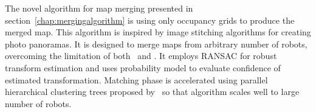 The novel algorithm for map merging presented in section~\ref{chap:mergingalgorithm} is using only occupancy grids to produce the merged map. This algorithm is inspired by image stitching algorithms for creating photo panoramas. It is designed to merge maps from arbitrary number of robots, overcoming the limitation of both~\cite{MapstitchROS} and \cite{Carpin2008}. It employs \gls{RANSAC} for robust transform estimation and uses probability model to evaluate confidence of estimated transformation. Matching phase is accelerated using parallel hierarchical clustering trees proposed by~\cite{Muja2012} so that algorithm scales well to large number of robots.

